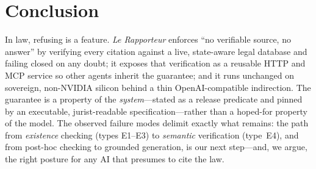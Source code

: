 \section{Conclusion}
In law, refusing is a feature. \emph{Le Rapporteur} enforces ``no verifiable
source, no answer'' by verifying every citation against a live, state-aware
legal database and failing closed on any doubt; it exposes that verification as
a reusable HTTP and MCP service so other agents inherit the guarantee; and it
runs unchanged on sovereign, non-NVIDIA silicon behind a thin
OpenAI-compatible indirection. The guarantee is a property of the
\emph{system}---stated as a release predicate and pinned by an executable,
jurist-readable specification---rather than a hoped-for property of the model.
The observed failure modes delimit exactly what remains: the path from
\emph{existence} checking (types E1--E3) to \emph{semantic} verification
(type~E4), and from post-hoc checking to grounded generation, is our next
step---and, we argue, the right posture for any AI that presumes to cite the
law.
